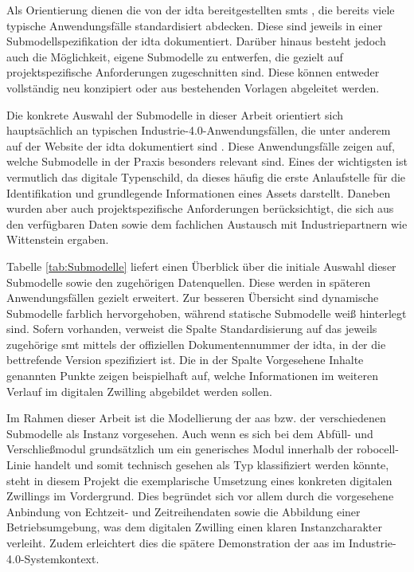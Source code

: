 Als Orientierung dienen die von der \acs{idta} bereitgestellten \acsp{smt} \cite{idtaTemplates}, die bereits viele typische Anwendungsfälle standardisiert abdecken.
Diese sind jeweils in einer Submodellspezifikation der \acs{idta} dokumentiert.
Darüber hinaus besteht jedoch auch die Möglichkeit, eigene Submodelle zu entwerfen, die gezielt auf projektspezifische Anforderungen zugeschnitten sind.
Diese können entweder vollständig neu konzipiert oder aus bestehenden Vorlagen abgeleitet werden.

Die konkrete Auswahl der Submodelle in dieser Arbeit orientiert sich hauptsächlich an typischen Industrie-4.0-Anwendungsfällen, die unter anderem auf der Website der \acs{idta} dokumentiert sind \cite{idtaUseCases}.
Diese Anwendungsfälle zeigen auf, welche Submodelle in der Praxis besonders relevant sind.
Eines der wichtigsten ist vermutlich das digitale Typenschild, da dieses häufig die erste Anlaufstelle für die Identifikation und grundlegende Informationen eines Assets darstellt.
Daneben wurden aber auch projektspezifische Anforderungen berücksichtigt, die sich aus den verfügbaren Daten sowie dem fachlichen Austausch mit Industriepartnern wie Wittenstein ergaben.

Tabelle \ref{tab:Submodelle} liefert einen Überblick über die initiale Auswahl dieser Submodelle sowie den zugehörigen Datenquellen.
Diese werden in späteren Anwendungsfällen gezielt erweitert.
Zur besseren Übersicht sind dynamische Submodelle farblich hervorgehoben, während statische Submodelle weiß hinterlegt sind.
Sofern vorhanden, verweist die Spalte Standardisierung auf das jeweils zugehörige \acs{smt} mittels der offiziellen Dokumentennummer der \acs{idta}, in der die bettrefende Version spezifiziert ist.
Die in der Spalte Vorgesehene Inhalte genannten Punkte zeigen beispielhaft auf, welche Informationen im weiteren Verlauf im digitalen Zwilling abgebildet werden sollen.



\newpage
Im Rahmen dieser Arbeit ist die Modellierung der \acs{aas} bzw. der verschiedenen Submodelle als Instanz vorgesehen.
Auch wenn es sich bei dem Abfüll- und Verschließmodul grundsätzlich um ein generisches Modul innerhalb der robocell-Linie handelt und somit technisch gesehen als Typ klassifiziert werden könnte, steht in diesem Projekt die exemplarische Umsetzung eines konkreten digitalen Zwillings im Vordergrund.
Dies begründet sich vor allem durch die vorgesehene Anbindung von Echtzeit- und Zeitreihendaten sowie die Abbildung einer Betriebsumgebung, was dem digitalen Zwilling einen klaren Instanzcharakter verleiht.
Zudem erleichtert dies die spätere Demonstration der \acs{aas} im Industrie-4.0-Systemkontext.

